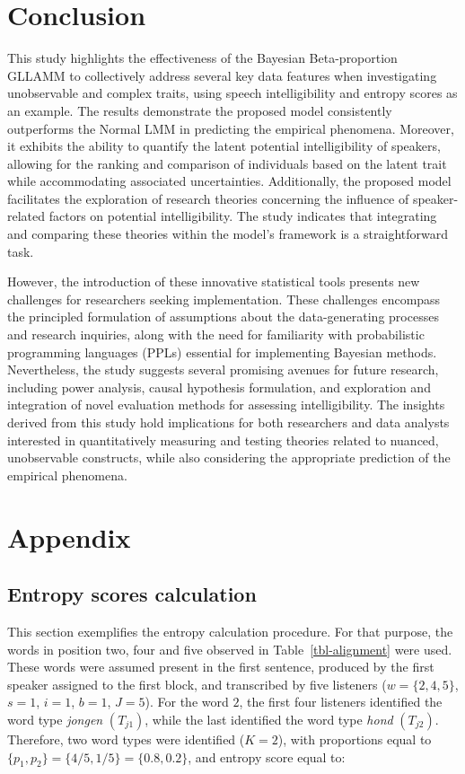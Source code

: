 \documentclass[
]{agujournal2019}
\begin{document}
\section{Conclusion}\label{sec-conclusion}

This study highlights the effectiveness of the Bayesian Beta-proportion
GLLAMM to collectively address several key data features when
investigating unobservable and complex traits, using speech
intelligibility and entropy scores as an example. The results
demonstrate the proposed model consistently outperforms the Normal LMM
in predicting the empirical phenomena. Moreover, it exhibits the ability
to quantify the latent potential intelligibility of speakers, allowing
for the ranking and comparison of individuals based on the latent trait
while accommodating associated uncertainties. Additionally, the proposed
model facilitates the exploration of research theories concerning the
influence of speaker-related factors on potential intelligibility. The
study indicates that integrating and comparing these theories within the
model's framework is a straightforward task.

However, the introduction of these innovative statistical tools presents
new challenges for researchers seeking implementation. These challenges
encompass the principled formulation of assumptions about the
data-generating processes and research inquiries, along with the need
for familiarity with probabilistic programming languages (PPLs)
essential for implementing Bayesian methods. Nevertheless, the study
suggests several promising avenues for future research, including power
analysis, causal hypothesis formulation, and exploration and integration
of novel evaluation methods for assessing intelligibility. The insights
derived from this study hold implications for both researchers and data
analysts interested in quantitatively measuring and testing theories
related to nuanced, unobservable constructs, while also considering the
appropriate prediction of the empirical phenomena.

\section{Appendix}\label{sec-appendix}

\subsection{Entropy scores calculation}\label{sec-appA}

This section exemplifies the entropy calculation procedure. For that
purpose, the words in position two, four and five observed in
Table~\ref{tbl-alignment} were used. These words were assumed present in
the first sentence, produced by the first speaker assigned to the first
block, and transcribed by five listeners (\(w=\{2,4,5\}\), \(s=1\),
\(i=1\), \(b=1\), \(J=5\)). For the word \(2\), the first four listeners
identified the word type \emph{jongen} \((T_{j1})\), while the last
identified the word type \emph{hond} \((T_{j2})\). Therefore, two word
types were identified (\(K=2\)), with proportions equal to
\(\{ p_{1}, p_{2} \} = \{ 4/5, 1/5 \} = \{ 0.8, 0.2 \}\), and entropy
score equal to:
\end{document}
